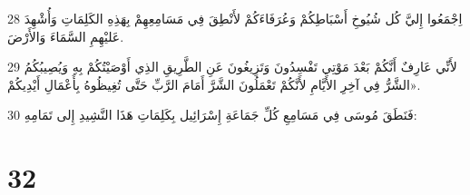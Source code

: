 \par 28 اِجْمَعُوا إِليَّ كُل شُيُوخِ أَسْبَاطِكُمْ وَعُرَفَاءَكُمْ لأَنْطِقَ فِي مَسَامِعِهِمْ بِهَذِهِ الكَلِمَاتِ وَأُشْهِدَ عَليْهِمِ السَّمَاءَ وَالأَرْضَ.
\par 29 لأَنِّي عَارِفٌ أَنَّكُمْ بَعْدَ مَوْتِي تَفْسِدُونَ وَتَزِيغُونَ عَنِ الطَّرِيقِ الذِي أَوْصَيْتُكُمْ بِهِ وَيُصِيبُكُمُ الشَّرُّ فِي آخِرِ الأَيَّامِ لأَنَّكُمْ تَعْمَلُونَ الشَّرَّ أَمَامَ الرَّبِّ حَتَّى تُغِيظُوهُ بِأَعْمَالِ أَيْدِيكُمْ».
\par 30 فَنَطَقَ مُوسَى فِي مَسَامِعِ كُلِّ جَمَاعَةِ إِسْرَائِيل بِكَلِمَاتِ هَذَا النَّشِيدِ إِلى تَمَامِهِ:

\chapter{32}

